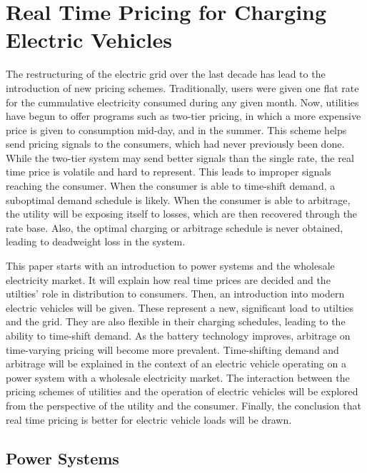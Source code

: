 \section{Real Time Pricing for Charging Electric Vehicles}
The restructuring of the electric grid over the last decade has lead to the introduction of new pricing schemes.  Traditionally, users were given one flat rate for the cummulative electricity consumed during any given month.  Now, utilities have begun to offer programs such as two-tier pricing, in which a more expensive price is given to consumption mid-day, and in the summer.  This scheme helps send pricing signals to the consumers, which had never previously been done.  While the two-tier system may send better signals than the single rate, the real time price is volatile and hard to represent.  This leads to improper signals reaching the consumer.  When the consumer is able to time-shift demand, a suboptimal demand schedule is likely.  When the consumer is able to arbitrage, the utility will be exposing itself to losses, which are then recovered through the rate base.  Also, the optimal charging or arbitrage schedule is never obtained, leading to deadweight loss in the system.

This paper starts with an introduction to power systems and the wholesale electricity market.  It will explain how real time prices are decided and the utilties' role in distribution to consumers.  Then, an introduction into modern electric vehicles will be given.  These represent a new, significant load to utilties and the grid.  They are also flexible in their charging schedules, leading to the ability to time-shift demand.  As the battery technology improves, arbitrage on time-varying pricing will become more prevalent.  Time-shifting demand and arbitrage will be explained in the context of an electric vehicle operating on a power system with a wholesale electricity market.  The interaction between the pricing schemes of utilities and the operation of electric vehicles will be explored from the perspective of the utility and the consumer.  Finally, the conclusion that real time pricing is better for electric vehicle loads will be drawn.


\subsection{Power Systems}
	
